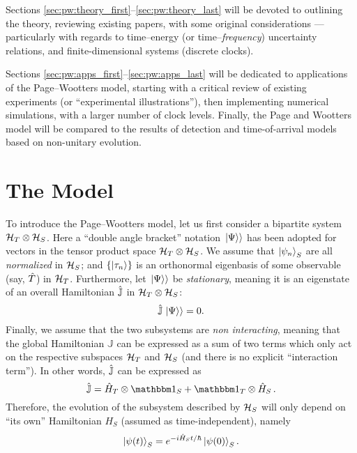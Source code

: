 Sections \ref{sec:pw:theory_first}--\ref{sec:pw:theory_last}
will be devoted to outlining the theory, reviewing existing papers,
with some original considerations ---particularly with regards to
time--energy (or time--\emph{frequency}) uncertainty relations, and
finite-dimensional systems (discrete clocks).

Sections \ref{sec:pw:apps_first}--\ref{sec:pw:apps_last} will be dedicated to
applications of the Page--Wootters model, starting with a critical review of existing
experiments (or ``experimental illustrations''),
then implementing numerical simulations, with a larger number of clock levels.
Finally, the Page and Wootters model will be compared to the results of
detection and time-of-arrival models
based on non-unitary evolution.

\section{The Model}

To introduce the Page--Wootters model, let us first consider
a bipartite system $\mathcal{H}_T \otimes \mathcal{H}_S$.
Here
a ``double angle bracket'' notation $\left.\left| \Psi \right\rangle\right\rangle$ has been adopted
for vectors in the tensor product space $\mathcal{H}_T \otimes \mathcal{H}_S$.
We assume that $\ket{\psi_{n}}_{S}$ are all \emph{normalized} in $\mathcal{H}_S$;
and
$\qty{\ket{{\tau}_n}}$ is an orthonormal eigenbasis of some observable (say, $\hat{T}$)
in $\mathcal{H}_T$.
Furthermore, let $\left.\left| \Psi \right\rangle\right\rangle$ be \emph{stationary}, meaning it is an eigenstate
of an overall Hamiltonian $\hat{\mathbb{J}}$ in $\mathcal{H}_T \otimes \mathcal{H}_S$:
$$
  \hat{\mathbb{J}} \left.\left| \Psi \right\rangle\right\rangle = 0 \text{.}
$$
Finally, we assume that the two subsystems
are \emph{non interacting},
meaning that the global Hamiltonian $\mathbb{J}$ can be expressed as a sum of two terms
which only act on the respective subspaces $\mathcal{H}_T$ and $\mathcal{H}_S$
(and there is no explicit ``interaction term''). In other words,
$\hat{\mathbb{J}}$ can be expressed as
$$
  \op{\mathbb{J}} = \op{H}_T \ox \idop_S + \idop_T \ox \op{H}_S \, \text{.} 
$$
Therefore,
the evolution of the subsystem described by $\mathcal{H}_S$
will only depend on ``its own''
Hamiltonian $H_S$ (assumed as time-independent), namely
\begin{equation}\label{eq:pw:ordinary_S}
  \ket{\psi(t)}_S = e^{- i \hat{H}_S t / \hbar} \ket{\psi(0)}_S \text{.}  
\end{equation}
 
